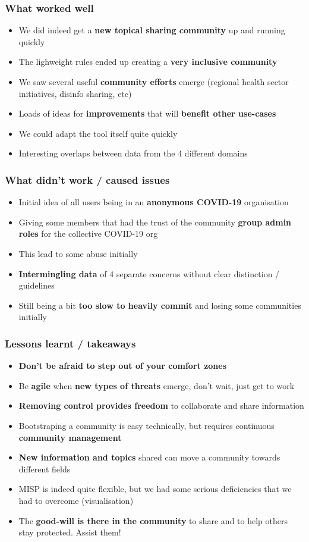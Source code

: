 \begin{frame}
 \frametitle{What worked well}
 \begin{itemize}
         \item We did indeed get a {\bf new topical sharing community} up and running quickly
         \item The lighweight rules ended up creating a {\bf very inclusive community}
         \item We saw several useful {\bf community efforts} emerge (regional health sector initiatives, disinfo sharing, etc)
         \item Loads of ideas for {\bf improvements} that will {\bf benefit other use-cases}
         \item We could adapt the tool itself quite quickly
         \item Interesting overlaps between data from the 4 different domains
 \end{itemize}
\end{frame}

\begin{frame}
 \frametitle{What didn't work / caused issues}
 \begin{itemize}
         \item Initial idea of all users being in an {\bf anonymous COVID-19} organisation
         \item Giving some members that had the trust of the community {\bf group admin roles} for the collective COVID-19 org
         \item This lead to some abuse initially
         \item {\bf Intermingling data} of 4 separate concerns without clear distinction / guidelines
         \item Still being a bit {\bf too slow to heavily commit} and losing some communities initially
 \end{itemize}
\end{frame}

\begin{frame}
 \frametitle{Lessons learnt / takeaways}
 \begin{itemize}
         \item {\bf Don't be afraid to step out of your comfort zones}
         \item Be {\bf agile} when {\bf new types of threats} emerge, don't wait, just get to work
         \item {\bf Removing control provides freedom} to collaborate and share information
         \item Bootstraping a community is easy technically, but requires continuous {\bf community management}
         \item {\bf New information and topics} shared can move a community towards different fields
         \item MISP is indeed quite flexible, but we had some serious deficiencies that we had to overcome (visualisation)
         \item The {\bf good-will is there in the community} to share and to help others stay protected. Assist them!
 \end{itemize}
\end{frame}

